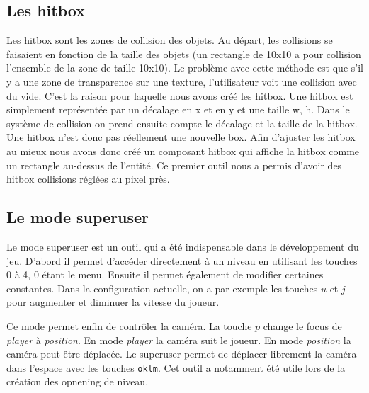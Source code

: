 \documentclass{article}
\begin{document}
\subsection{Les hitbox}
Les hitbox sont les zones de collision des objets. Au départ, les collisions se faisaient en fonction de 
la taille des objets (un rectangle de 10x10 a pour collision l'ensemble de la zone de taille 10x10). Le 
problème avec cette méthode est que s'il y a une zone de transparence sur une texture, l'utilisateur voit 
une collision avec du vide. C'est la raison pour laquelle nous avons créé les hitbox. Une hitbox est 
simplement représentée par un décalage en x et en y et une taille w, h. Dans le système de collision on 
prend ensuite compte le décalage et la taille de la hitbox. Une hitbox n'est donc pas réellement une 
nouvelle box. Afin d'ajuster les hitbox au mieux nous avons donc créé un composant hitbox qui affiche 
la hitbox comme un rectangle au-dessus de l'entité. Ce premier outil nous a permis d'avoir des hitbox 
collisions réglées au pixel près.

\subsection{Le mode superuser}
Le mode superuser est un outil qui a été indispensable dans le développement du jeu. D'abord il permet 
d'accéder directement à un niveau en utilisant les touches 0 à 4, 0 étant le menu. Ensuite il permet 
également de modifier certaines constantes. Dans la configuration actuelle, on a par exemple les 
touches $u$ et $j$ pour augmenter et diminuer la vitesse du joueur.

Ce mode permet enfin de contrôler la caméra. La touche $p$ change le focus de \textit{player} à 
\textit{position}. En mode \textit{player} la caméra suit le joueur. En mode \textit{position} 
la caméra peut être déplacée. Le superuser permet de déplacer librement la caméra dans l'espace
 avec les touches \verb|oklm|. Cet outil a notamment été utile lors de la création des opnening 
 de niveau.
\end{document}
